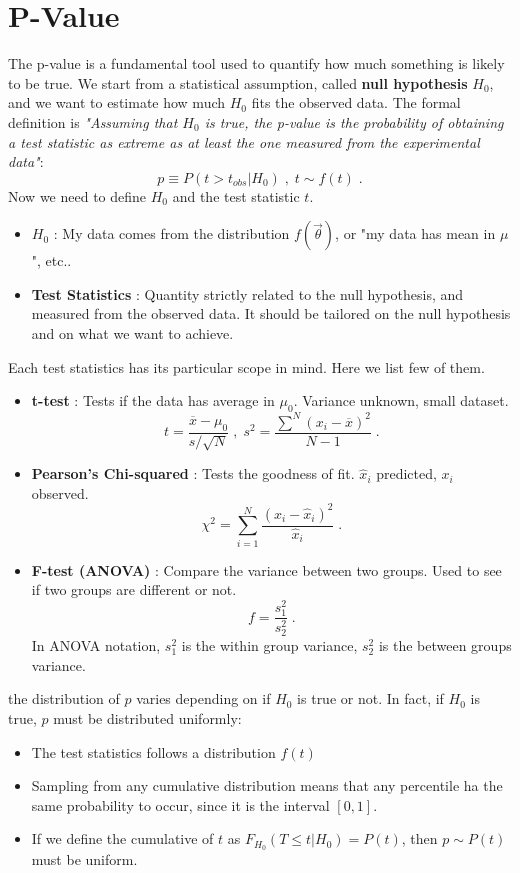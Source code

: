 \documentclass[12pt,a4paper]{article}
\begin{document}
\section{P-Value}
The p-value is a fundamental tool used to quantify how much something is likely to be true. We start from a statistical assumption, called \textbf{null hypothesis} $H_0$, and we want to estimate how much $H_0$ fits the observed data.
The formal definition is \textit{"Assuming that $H_0$ is true, the p-value is the probability of obtaining a test statistic as extreme as at least the one measured from the experimental data"}:
$$
p \equiv P(t>t_{obs} | H_0)\;,\; t\sim f(t)\;.
$$
Now we need to define $H_0$ and the test statistic $t$.
\begin{itemize}
	\item $H_0$ : My data comes from the distribution $f(\vec{\theta})$, or "my data has mean in $\mu$", etc..
	\item \textbf{Test Statistics} : Quantity strictly related to the null hypothesis, and measured from the observed data. It should be tailored on the null hypothesis and on what we want to achieve.
\end{itemize}
Each test statistics has its particular scope in mind. Here we list few of them.
\begin{itemize}
	\item \textbf{t-test} : Tests if the data has average in $\mu_0$. Variance unknown, small dataset. $$t=\frac{\overline{x}-\mu_0}{s/\sqrt{N}} \;,\; s^2 = \frac{ \sum^{N}(x_i - \overline{x})^2 }{N-1}\;.$$
	\item \textbf{Pearson's Chi-squared} : Tests the goodness of fit. $\hat{x}_i$ predicted, $x_i$ observed. $$\chi^2 = \sum_{i=1}^{N} \frac{(x_i-\hat{x}_i)^2}{\hat{x}_i}\;.$$
	\item \textbf{F-test (ANOVA)} : Compare the variance between two groups. Used to see if two groups are different or not. $$ f = \frac{s^2_1}{s^2_2}\;.$$In ANOVA notation, $s^2_1$ is the within group variance, $s^2_2$ is the between groups variance.
\end{itemize}
the distribution of $p$ varies depending on if $H_0$ is true or not. In fact, if $H_0$ is true, $p$ must be distributed uniformly:
\begin{itemize}
	\item The test statistics follows a distribution $f(t)$
	\item Sampling from any cumulative distribution means that any percentile ha the same probability to occur, since it is the interval $[0,1]$.
	\item If we define the cumulative of $t$ as $F_{H_0}(T\leq t | H_0) = P(t)$, then $p\sim P(t)$ must be uniform.
\end{itemize}
\end{document}
